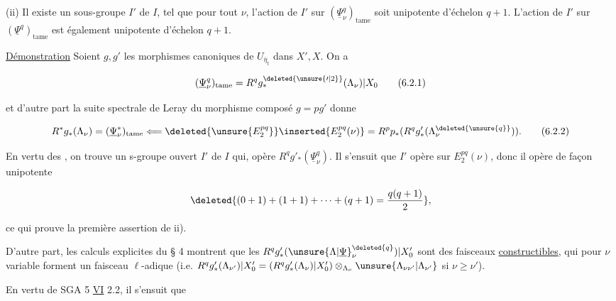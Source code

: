 
(ii) Il existe un sous-groupe  $I'$ de $I$,  tel que pour tout $\nu$, l'action de $I'$ sur $(\underline{\Psi}_\nu^q)_{\mathrm{tame}}$ soit unipotente d'échelon  $q+1$.  L'action de $I'$ sur $(\underline{\Psi}^q)_{\mathrm{tame}}$ est également unipotente d'échelon  $q+1$.

\uline{Démonstration} Soient $g,g'$ les morphismes canoniques de $U_{\overline\eta_t}$ dans $X',X$. On a


\[
(\underline{\Psi}_\nu^q)_{\mathrm{tame}}=R^q g_*^{\deleted{\unsure{\prime|2}}}(\Lambda_\nu)|X_0
\tag*{(6.2.1)}
\]

et  d'autre part la suite spectrale de Leray du morphisme composé $g=pg'$ donne

\[
R^*g_*(\Lambda_\nu)=(\underline{\Psi}_\nu^*)_{\mathrm{tame}}\Longleftarrow\deleted{\unsure{E_2^{pq}}}\inserted{E_2^{pq}(\nu)}=R^p p_*(R^q g'_*(\Lambda_\nu^{\deleted{\unsure{q}}})).
\tag*{(6.2.2)}
\]

En vertu des , on trouve un s-groupe ouvert $I'$ de $I$ qui,  opère  $R^q g'_*(\underline{\Psi}_\nu^q)$. Il s'ensuit que $I'$ opère   sur $E_2^{pq}(\nu)$, donc  il opère de façon unipotente  

\[
\deleted{(0+1)+(1+1)+\cdots+(q+1)=\frac{q(q+1)}{2}},
\]

ce qui prouve la première assertion de ii).

D'autre part, les calculs explicites du § 4 montrent que les $R^q g'_*(\unsure{\Lambda|\underline{\Psi}}_\nu^{\deleted{q}})|X'_0$ sont des faisceaux \uline{constructibles}, qui pour $\nu$ variable forment un faisceau  $\ell$-adique (i.e. $R^q g'_*(\Lambda_{\nu'})|X'_0=(R^q g'_*(\Lambda_\nu)|X'_0)\otimes_{\Lambda_\nu}\unsure{\Lambda_{\nu\nu'}|\Lambda_{\nu'}}$ si $\nu\geq\nu'$).

En vertu de SGA 5 \uline{VI} 2.2, il s'ensuit que
